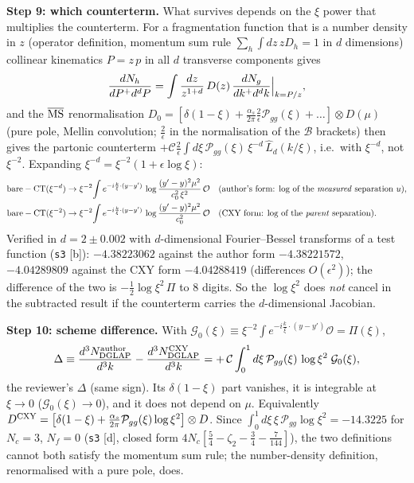 \medskip
\noindent\textbf{Step 9: which counterterm.} What survives depends on the $\xi$ power that multiplies the counterterm. For a fragmentation function that is a number density in $z$ (operator definition, momentum sum rule $\sum_{h}\int dz\,zD_{h}=1$ in $d$ dimensions) collinear kinematics $P=z\,p$ in all $d$ transverse components gives
\begin{align}
\frac{dN_{h}}{dP^{+}d^{d}P}=\int\frac{dz}{z^{1+d}}\,D(z)\,\frac{dN_{g}}{dk^{+}d^{d}k}\Big|_{k=P/z},
\notag
\end{align}
and the $\overline{\rm MS}$ renormalisation $D_{0}=[\delta(1-\xi)+\frac{\alpha_{s}}{2\pi}\frac{2}{\epsilon}\mathcal{P}_{gg}(\xi)+\dots]\otimes D(\mu)$ (pure pole, Mellin convolution; $\frac{2}{\epsilon}$ in the normalisation of the $\mathcal{B}$ brackets) then gives the partonic counterterm $+\mathcal{C}\frac{2}{\epsilon}\int d\xi\,\mathcal{P}_{gg}(\xi)\,\xi^{-d}\,\widehat{L}_{d}(k/\xi)$, i.e.\ with $\xi^{-d}$, not $\xi^{-2}$. Expanding $\xi^{-d}=\xi^{-2}(1+\epsilon\log\xi)$:
\begin{align}
\text{bare}-\text{CT}(\xi^{-d})&\to\xi^{-2}\!\int e^{-i\frac{k}{\xi}\cdot(y-y')}\,\log\frac{(y'-y)^{2}\mu^{2}}{c_{0}^{2}\,\xi^{2}}\,\mathcal{O}\quad\text{(author's form: log of the \emph{measured} separation $u$)},\notag\\
\text{bare}-\text{CT}(\xi^{-2})&\to\xi^{-2}\!\int e^{-i\frac{k}{\xi}\cdot(y-y')}\,\log\frac{(y'-y)^{2}\mu^{2}}{c_{0}^{2}}\,\mathcal{O}\quad\text{(CXY form: log of the \emph{parent} separation)}.
\label{eq:pd-two}
\end{align}
Verified in $d=2\pm0.002$ with $d$-dimensional Fourier--Bessel transforms of a test function (\texttt{s3} [b]): $-4.38223062$ against the author form $-4.38221572$, $-4.04289809$ against the CXY form $-4.04288419$ (differences $O(\epsilon^{2})$); the difference of the two is $-\frac12\log\xi^{2}\,\Pi$ to 8 digits. So the $\log\xi^{2}$ does \emph{not} cancel in the subtracted result if the counterterm carries the $d$-dimensional Jacobian.

\medskip
\noindent\textbf{Step 10: scheme difference.} With $\mathcal{G}_{0}(\xi)\equiv\xi^{-2}\int e^{-i\frac{k}{\xi}\cdot(y-y')}\mathcal{O}=\Pi(\xi)$,
\begin{align}
\Delta\equiv\frac{d^{3}N_{\rm DGLAP}^{\rm author}}{d^{3}k}-\frac{d^{3}N_{\rm DGLAP}^{\rm CXY}}{d^{3}k}=+\,\mathcal{C}\int_{0}^{1}d\xi\,\mathcal{P}_{gg}(\xi)\,\log\xi^{2}\;\mathcal{G}_{0}(\xi),
\label{eq:pd-Delta}
\end{align}
the reviewer's $\Delta$ (same sign). Its $\delta(1-\xi)$ part vanishes, it is integrable at $\xi\to0$ ($\mathcal{G}_{0}(\xi)\to0$), and it does not depend on $\mu$. Equivalently $D^{\rm CXY}=\big[\delta(1-\xi)+\frac{\alpha_{s}}{2\pi}\mathcal{P}_{gg}(\xi)\log\xi^{2}\big]\otimes D$. Since $\int_{0}^{1}d\xi\,\xi\,\mathcal{P}_{gg}\log\xi^{2}=-14.3225$ for $N_{c}=3$, $N_{f}=0$ (\texttt{s3} [d], closed form $4N_{c}[\frac54-\zeta_{2}-\frac34-\frac{7}{144}]$), the two definitions cannot both satisfy the momentum sum rule; the number-density definition, renormalised with a pure pole, does.

